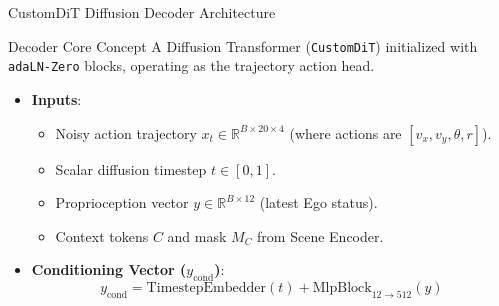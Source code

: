 \documentclass[t]{beamer}
\begin{document}
\begin{frame}{CustomDiT Diffusion Decoder Architecture}
    \begin{block}{Decoder Core Concept}
        A Diffusion Transformer (\texttt{CustomDiT}) initialized with \texttt{adaLN-Zero} blocks, operating as the trajectory action head.
    \end{block}

    \begin{itemize}
        \item \textbf{Inputs}:
          \begin{itemize}
              \item Noisy action trajectory $x_t \in \mathbb{R}^{B \times 20 \times 4}$ (where actions are $[v_x, v_y, \theta, r]$).
              \item Scalar diffusion timestep $t \in [0, 1]$.
              \item Proprioception vector $y \in \mathbb{R}^{B \times 12}$ (latest Ego status).
              \item Context tokens $C$ and mask $M_C$ from Scene Encoder.
          \end{itemize}
        \item \textbf{Conditioning Vector ($y_{\text{cond}}$)}:
          $$y_{\text{cond}} = \mathrm{TimestepEmbedder}(t) + \mathrm{MlpBlock}_{12 \to 512}(y)$$
    \end{itemize}
\end{frame}
\end{document}
